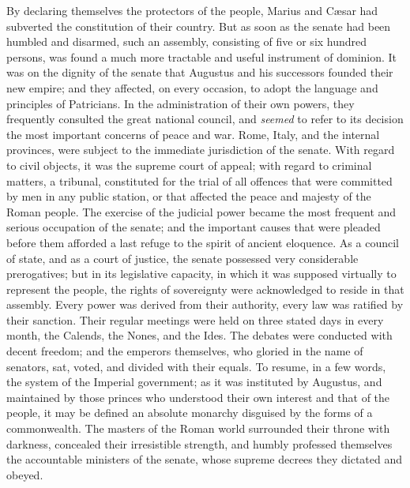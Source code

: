 

By declaring themselves the protectors of the people, Marius and
Cæsar had subverted the constitution of their country. But as
soon as the senate had been humbled and disarmed, such an
assembly, consisting of five or six hundred persons, was found a
much more tractable and useful instrument of dominion. It was on
the dignity of the senate that Augustus and his successors
founded their new empire; and they affected, on every occasion,
to adopt the language and principles of Patricians. In the
administration of their own powers, they frequently consulted the
great national council, and \textit{seemed} to refer to its decision the
most important concerns of peace and war. Rome, Italy, and the
internal provinces, were subject to the immediate jurisdiction of
the senate. With regard to civil objects, it was the supreme
court of appeal; with regard to criminal matters, a tribunal,
constituted for the trial of all offences that were committed by
men in any public station, or that affected the peace and majesty
of the Roman people. The exercise of the judicial power became
the most frequent and serious occupation of the senate; and the
important causes that were pleaded before them afforded a last
refuge to the spirit of ancient eloquence. As a council of state,
and as a court of justice, the senate possessed very considerable
prerogatives; but in its legislative capacity, in which it was
supposed virtually to represent the people, the rights of
sovereignty were acknowledged to reside in that assembly. Every
power was derived from their authority, every law was ratified by
their sanction. Their regular meetings were held on three stated
days in every month, the Calends, the Nones, and the Ides. The
debates were conducted with decent freedom; and the emperors
themselves, who gloried in the name of senators, sat, voted, and
divided with their equals. To resume, in a few words, the system
of the Imperial government; as it was instituted by Augustus, and
maintained by those princes who understood their own interest and
that of the people, it may be defined an absolute monarchy
disguised by the forms of a commonwealth. The masters of the
Roman world surrounded their throne with darkness, concealed
their irresistible strength, and humbly professed themselves the
accountable ministers of the senate, whose supreme decrees they
dictated and obeyed.\footnotemark[19]

